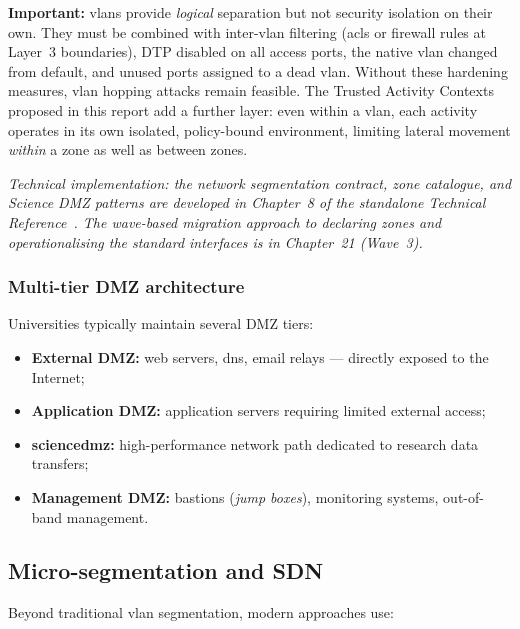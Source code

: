 \smallskip\noindent\textbf{Important:} \gls{vlan}s provide \emph{logical}
separation but not security isolation on their own. They must be
combined with inter-\gls{vlan} filtering (\gls{acl}s or firewall rules at Layer~3
boundaries), DTP disabled on all access ports, the native \gls{vlan} changed
from default, and unused ports assigned to a dead \gls{vlan}. Without these
hardening measures, \gls{vlan} hopping attacks remain feasible. The Trusted
Activity Contexts proposed in this report add a further layer: even
within a \gls{vlan}, each activity operates in its own isolated, policy-bound
environment, limiting lateral movement \emph{within} a zone as well as
between zones.

\smallskip\noindent\textit{\footnotesize Technical implementation:
the network segmentation contract, zone catalogue, and Science DMZ
patterns are developed in Chapter~8 of the standalone Technical
Reference~\cite{ng-tech-ref-2026}. The wave-based migration approach
to declaring zones and operationalising the standard interfaces is
in Chapter~21 (Wave~3).}

\subsubsection{Multi-tier DMZ architecture}

Universities typically maintain several DMZ tiers:

\begin{itemize}[nosep]
    \item \textbf{External DMZ:} web servers, \gls{dns}, email relays ---
    directly exposed to the Internet;
    \item \textbf{Application DMZ:} application servers requiring
    limited external access;
    \item \textbf{\gls{sciencedmz}:} high-performance network path dedicated
    to research data transfers;
    \item \textbf{Management DMZ:} bastions (\emph{jump boxes}),
    monitoring systems, out-of-band management.
\end{itemize}

\subsection{Micro-segmentation and SDN}
\label{subsec:microseg}

Beyond traditional \gls{vlan} segmentation, modern approaches use:

